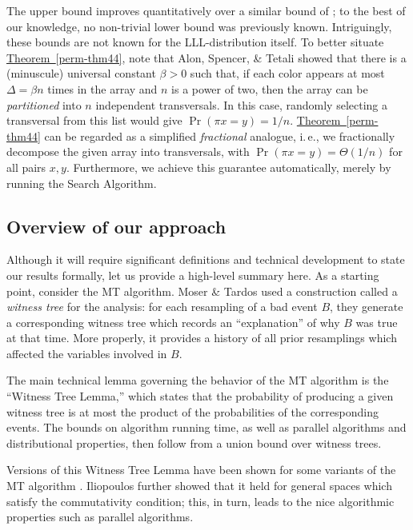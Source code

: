 \documentclass[11pt]{article}
\newcommand{\expref}[2]{\texorpdfstring{\hyperref[#2]{#1~\ref{#2}}}{#1~\ref{#2}}}
\newcommand{\ie}{i.\,e.}
\begin{document}
The upper bound improves quantitatively over a similar bound of \cite{NewBoundsHarris}; to the best of our knowledge, no non-trivial lower bound was previously known. Intriguingly, these bounds are not known  for the LLL-distribution itself.  To better situate \expref{Theorem}{perm-thm44}, note that Alon, Spencer, \& Tetali \cite{alon1995covering} showed that there is a (minuscule) universal constant $\beta > 0$ such that, if each color appears at most $\Delta = \beta n$ times in the array and $n$ is a power of two, then the array can be \emph{partitioned} into $n$ independent transversals. In this case, randomly selecting  a transversal from this list would give  $\Pr( \pi x = y) = 1/n$. \expref{Theorem}{perm-thm44} can be regarded as a simplified \emph{fractional} analogue, \ie, we fractionally decompose the given array into  transversals, with $\Pr( \pi x = y) = \Theta(1/n)$ for all pairs $x,y$. Furthermore, we achieve this guarantee automatically, merely by running the Search Algorithm. 


\subsection{Overview of our approach}

Although it will require significant definitions and technical development to state our results formally, let us provide a high-level summary here. As a starting point, consider the MT algorithm. Moser \& Tardos \cite{MT} used a construction called a \emph{witness tree} for the analysis: for each resampling of a 
%
bad event %
 $B$, they generate a corresponding witness tree which records an ``explanation'' of why $B$ was true at that time. More properly, it provides a history of all prior resamplings which affected the variables involved in $B$.  

The main technical lemma governing the behavior of the MT algorithm is the ``Witness Tree Lemma,'' which states that the probability of producing a given witness tree is at most the product of the probabilities of the corresponding events.
%
%
The bounds on
%
%
algorithm running time,  %
as well as parallel algorithms and distributional properties, then follow from a union bound over witness trees. 

Versions of this Witness Tree Lemma have been shown for some variants of the MT algorithm \cite{LLLLBeyond, PartResmp1}. Iliopoulos \cite{LLLWTL} further showed that it held for general spaces which satisfy the commutativity %
condition;  %
this, in turn, leads to the nice algorithmic properties such as parallel algorithms.
\end{document}
